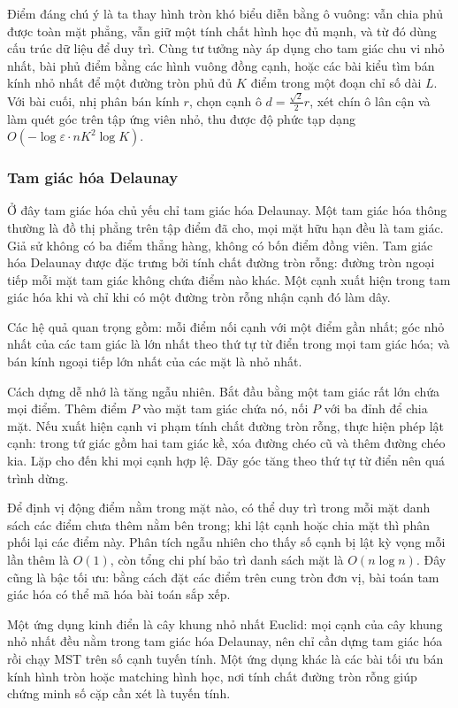 \documentclass[11pt]{article}
\begin{document}
Điểm đáng chú ý là ta thay hình tròn khó biểu diễn bằng ô vuông: vẫn chia phủ
được toàn mặt phẳng, vẫn giữ một tính chất hình học đủ mạnh, và từ đó dùng cấu
trúc dữ liệu để duy trì. Cùng tư tưởng này áp dụng cho tam giác chu vi nhỏ
nhất, bài phủ điểm bằng các hình vuông đồng cạnh, hoặc các bài kiểu tìm bán
kính nhỏ nhất để một đường tròn phủ đủ $K$ điểm trong một đoạn chỉ số dài $L$.
Với bài cuối, nhị phân bán kính $r$, chọn cạnh ô $d=\frac{\sqrt2}{2}r$, xét chín
ô lân cận và làm quét góc trên tập ứng viên nhỏ, thu được độ phức tạp dạng
$O(-\log\varepsilon\cdot nK^2\log K)$.

\subsubsection{Tam giác hóa Delaunay}

Ở đây tam giác hóa chủ yếu chỉ tam giác hóa Delaunay. Một tam giác hóa thông
thường là đồ thị phẳng trên tập điểm đã cho, mọi mặt hữu hạn đều là tam giác.
Giả sử không có ba điểm thẳng hàng, không có bốn điểm đồng viên. Tam giác hóa
Delaunay được đặc trưng bởi tính chất đường tròn rỗng: đường tròn ngoại tiếp
mỗi mặt tam giác không chứa điểm nào khác. Một cạnh xuất hiện trong tam giác hóa
khi và chỉ khi có một đường tròn rỗng nhận cạnh đó làm dây.

Các hệ quả quan trọng gồm: mỗi điểm nối cạnh với một điểm gần nhất; góc nhỏ
nhất của các tam giác là lớn nhất theo thứ tự từ điển trong mọi tam giác hóa;
và bán kính ngoại tiếp lớn nhất của các mặt là nhỏ nhất.

Cách dựng dễ nhớ là tăng ngẫu nhiên. Bắt đầu bằng một tam giác rất lớn chứa mọi
điểm. Thêm điểm $P$ vào mặt tam giác chứa nó, nối $P$ với ba đỉnh để chia mặt.
Nếu xuất hiện cạnh vi phạm tính chất đường tròn rỗng, thực hiện phép lật cạnh:
trong tứ giác gồm hai tam giác kề, xóa đường chéo cũ và thêm đường chéo kia.
Lặp cho đến khi mọi cạnh hợp lệ. Dãy góc tăng theo thứ tự từ điển nên quá trình
dừng.

Để định vị động điểm nằm trong mặt nào, có thể duy trì trong mỗi mặt danh sách
các điểm chưa thêm nằm bên trong; khi lật cạnh hoặc chia mặt thì phân phối lại
các điểm này. Phân tích ngẫu nhiên cho thấy số cạnh bị lật kỳ vọng mỗi lần thêm
là $O(1)$, còn tổng chi phí bảo trì danh sách mặt là $O(n\log n)$. Đây cũng là
bậc tối ưu: bằng cách đặt các điểm trên cung tròn đơn vị, bài toán tam giác hóa
có thể mã hóa bài toán sắp xếp.

Một ứng dụng kinh điển là cây khung nhỏ nhất Euclid: mọi cạnh của cây khung nhỏ
nhất đều nằm trong tam giác hóa Delaunay, nên chỉ cần dựng tam giác hóa rồi chạy
MST trên số cạnh tuyến tính. Một ứng dụng khác là các bài tối ưu bán kính hình
tròn hoặc matching hình học, nơi tính chất đường tròn rỗng giúp chứng minh số
cặp cần xét là tuyến tính.
\end{document}
